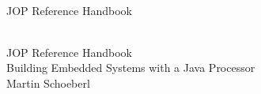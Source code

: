 \setcounter{page}{1}

\begin{flushleft}
\pagestyle{empty}
\ \\
\vspace{1cm}
{\mdseries\huge JOP Reference Handbook\\
}
\cleardoublepage
\end{flushleft}


\begin{flushleft}
\pagestyle{empty}
\ \\
\vspace{1cm}
{\Huge JOP Reference Handbook\\
\mdseries
{\Large Building Embedded Systems with a Java Processor}\\
\bigskip
\bigskip
\bigskip
{\huge Martin Schoeberl}
\medskip\\

}


\newpage
\end{flushleft}




